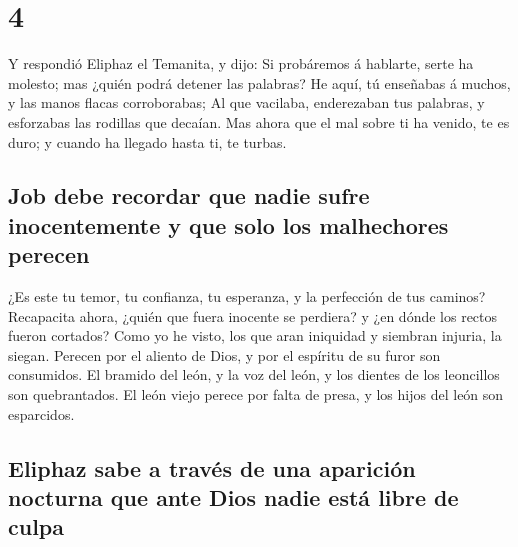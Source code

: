 \hypertarget{section-18-4}{%
\section{4}\label{section-18-4}}

 Y respondió Eliphaz el Temanita, y dijo: 
Si probáremos á hablarte, serte ha molesto; mas ¿quién podrá detener las
palabras?  He aquí, tú enseñabas á muchos, y las manos
flacas corroborabas;  Al que vacilaba, enderezaban tus
palabras, y esforzabas las rodillas que decaían.  Mas
ahora que el mal sobre ti ha venido, te es duro; y cuando ha llegado
hasta ti, te turbas.

\hypertarget{job-debe-recordar-que-nadie-sufre-inocentemente-y-que-solo-los-malhechores-perecen}{%
\subsection{Job debe recordar que nadie sufre inocentemente y que solo
los malhechores
perecen}\label{job-debe-recordar-que-nadie-sufre-inocentemente-y-que-solo-los-malhechores-perecen}}

 ¿Es este tu temor, tu confianza, tu esperanza, y la
perfección de tus caminos?  Recapacita ahora, ¿quién que
fuera inocente se perdiera? y ¿en dónde los rectos fueron cortados?
 Como yo he visto, los que aran iniquidad y siembran
injuria, la siegan.  Perecen por el aliento de Dios, y por
el espíritu de su furor son consumidos.  El bramido del
león, y la voz del león, y los dientes de los leoncillos son
quebrantados.  El león viejo perece por falta de presa, y
los hijos del león son esparcidos.

\hypertarget{eliphaz-sabe-a-travuxe9s-de-una-apariciuxf3n-nocturna-que-ante-dios-nadie-estuxe1-libre-de-culpa}{%
\subsection{Eliphaz sabe a través de una aparición nocturna que ante
Dios nadie está libre de
culpa}\label{eliphaz-sabe-a-travuxe9s-de-una-apariciuxf3n-nocturna-que-ante-dios-nadie-estuxe1-libre-de-culpa}}

